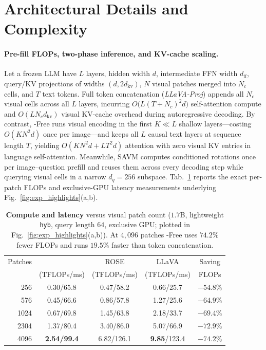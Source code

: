 \clearpage
\appendix
\setcounter{page}{1}
\setcounter{section}{0}
\setcounter{table}{0}
\setcounter{figure}{0}
\renewcommand{\thesection}{S\arabic{section}}
\renewcommand{\thetable}{S\arabic{table}}
\renewcommand{\thefigure}{S\arabic{figure}}
\maketitlesupplementary

\section{Architectural Details and Complexity}
\label{sec:supp_arch}

\paragraph{Pre-fill FLOPs, two-phase inference, and KV-cache scaling.}
Let a frozen LLM have $L$ layers, hidden width $d$, intermediate FFN width
$d_{\mathrm{ff}}$, query/KV projections of widths $(d, 2d_{\mathrm{kv}})$, $N$
visual patches merged into $N_c$ cells, and $T$ text tokens. Full token
concatenation (\emph{LLaVA-Proj}) appends all $N_c$ visual cells across all
$L$ layers, incurring $O\bigl(L(T{+}N_c)^2 d\bigr)$ self-attention compute and
$O(L N_c d_{\mathrm{kv}})$ visual KV-cache overhead during autoregressive
decoding. By contrast, \modelname-Free runs visual encoding in the first
$K{\ll}L$ shallow layers---costing $O(K N^2 d)$ once per image---and keeps all
$L$ causal text layers at sequence length $T$, yielding $O(K N^2 d + L T^2 d)$
attention with zero visual KV entries in language self-attention. Meanwhile,
SAVM computes conditioned rotations once per image--question prefill and reuses
them across every decoding step while querying visual cells in a narrow
$d_q{=}256$ subspace. Tab.~\ref{tab:supp_eff} reports the exact per-patch
FLOPs and exclusive-GPU latency measurements underlying
Fig.~\ref{fig:exp_highlights}(a,b).

\begin{table}[t]
\centering
\caption{\textbf{Compute and latency} versus visual patch count ($1.7$B,
lightweight \texttt{hyb}, query length $64$, exclusive GPU; plotted in
Fig.~\ref{fig:exp_highlights}(a,b)). At $4{,}096$ patches \modelname-Free{}
uses $74.2\%$ fewer FLOPs and runs $19.5\%$ faster than token concatenation.}
\label{tab:supp_eff}
\footnotesize
\setlength{\tabcolsep}{4pt}
\begin{tabular}{@{}rcccc@{}}
\toprule
Patches & \modelname{} & ROSE & LLaVA & Saving \\
 & (TFLOPs/ms) & (TFLOPs/ms) & (TFLOPs/ms) & FLOPs \\
\midrule
256  & 0.30/65.8  & 0.47/58.2  & 0.66/25.7  & $-54.8\%$ \\
576  & 0.45/66.6  & 0.86/57.8  & 1.27/25.6  & $-64.9\%$ \\
1024 & 0.67/69.8  & 1.45/63.8  & 2.18/33.7  & $-69.4\%$ \\
2304 & 1.37/80.4  & 3.40/86.0  & 5.07/66.9  & $-72.9\%$ \\
4096 & \textbf{2.54/99.4} & 6.82/126.1 & \textbf{9.85}/123.4 & $\mathbf{-74.2\%}$ \\
\bottomrule
\end{tabular}
\end{table}

